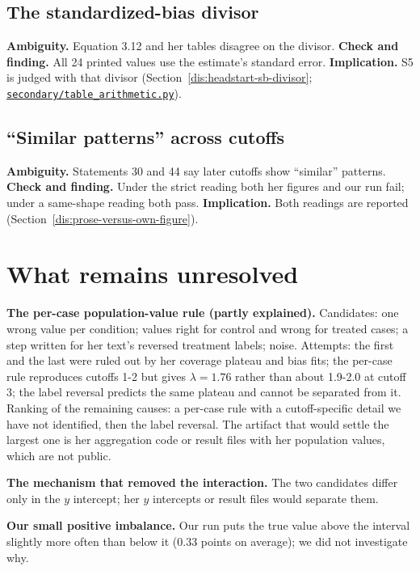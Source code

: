 \subsection{The standardized-bias divisor}\label{sec:amb-sb}
\textbf{Ambiguity.} Equation 3.12 and her tables disagree on the divisor. \textbf{Check and finding.} All 24 printed values use the estimate's standard error. \textbf{Implication.} S5 is judged with that divisor (Section~\ref{dis:headstart-sb-divisor}; \href{https://github.com/alectionary/vibe-math/blob/master/formalization/chen-rdd-mediation/secondary/table_arithmetic.py}{\nolinkurl{secondary/table_arithmetic.py}}).

\subsection{``Similar patterns'' across cutoffs}\label{sec:amb-similar}
\textbf{Ambiguity.} Statements 30 and 44 say later cutoffs show ``similar'' patterns. \textbf{Check and finding.} Under the strict reading both her figures and our run fail; under a same-shape reading both pass. \textbf{Implication.} Both readings are reported (Section~\ref{dis:prose-versus-own-figure}).

\section{What remains unresolved}\label{sec:unresolved}

\textbf{The per-case population-value rule (partly explained).} Candidates: one wrong value per condition; values right for control and wrong for treated cases; a step written for her text's reversed treatment labels; noise. Attempts: the first and the last were ruled out by her coverage plateau and bias fits; the per-case rule reproduces cutoffs 1-2 but gives $\lambda = 1.76$ rather than about 1.9-2.0 at cutoff 3; the label reversal predicts the same plateau and cannot be separated from it. Ranking of the remaining causes: a per-case rule with a cutoff-specific detail we have not identified, then the label reversal. The artifact that would settle the largest one is her aggregation code or result files with her population values, which are not public.

\textbf{The mechanism that removed the interaction.} The two candidates differ only in the $y$ intercept; her $y$ intercepts or result files would separate them.

\textbf{Our small positive imbalance.} Our run puts the true value above the interval slightly more often than below it (0.33 points on average); we did not investigate why.

